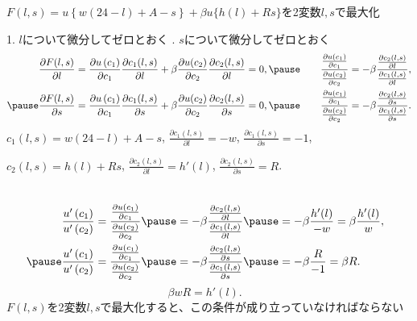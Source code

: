 \begin{frame}[t]{}
$F(l, s)=u\left\{w(24-l)+A-s\right\}+\beta u\{h(l)+Rs\}$を2変数$l, s$で最大化

\pause
{\scriptsize 1. $l$について微分してゼロとおく . $s$について微分してゼロとおく}
\[
\begin{aligned}
\frac{\partial F(l, s)}{\partial l}
&=
\frac{\partial u\left(c_{1}\right)}{\partial c_{1}}\frac{\partial c_{1}(l, s)}{\partial l}
+\beta \frac{\partial u(c_{2})}{\partial c_{2}}\frac{\partial c_{2}(l, s)}{\partial l}=0, 
\pause
\quad 
&\frac{\frac{\partial u\left(c_{1}\right)}{\partial c_{1}}}{\frac{\partial u\left(c_{2}\right)}{\partial c_{2}}}
&=
-\beta \frac{\frac{\partial c_{2}(l, s)}{\partial l}}{\frac{\partial c_{1}(l, s)}{\partial l}},\\
\pause
\frac{\partial F(l, s)}{\partial s}
&=
\frac{\partial u\left(c_{1}\right)}{\partial c_{1}}\frac{\partial c_{1}(l, s)}{\partial s}
+\beta \frac{\partial u(c_{2})}{\partial c_{2}}\frac{\partial c_{2}(l, s)}{\partial s}=0, 
\pause
\quad
&\frac{\frac{\partial u\left(c_{1}\right)}{\partial c_{1}}}{\frac{\partial u\left(c_{2}\right)}{\partial c_{2}}}
&=
-\beta \frac{\frac{\partial c_{2}(l, s)}{\partial s}}{\frac{\partial c_{1}(l, s)}{\partial s}}.
\end{aligned}
\]
\pause
$c_{1}(l, s)=w(24-l)+A-s$\pause, $\frac{\partial c_{1}(l, s)}{\partial l}=-w$, $\frac{\partial c_{1}(l, s)}{\partial s}=-1$, 

\pause
$c_{2}(l, s)=h(l)+Rs$\pause, $\frac{\partial c_{2}(l, s)}{\partial l}=h'(l)$, $\frac{\partial c_{2}(l, s)}{\partial s}=R$.
\begin{columns}[T]
\pause
\[
\begin{aligned}
\frac{u'\left(c_{1}\right)}{u'\left(c_{2}\right)}&=
\frac{\frac{\partial u\left(c_{1}\right)}{\partial c_{1}}}{\frac{\partial u\left(c_{2}\right)}{\partial c_{2}}}
\pause
=
-\beta \frac{\frac{\partial c_{2}(l, s)}{\partial l}}{\frac{\partial c_{1}(l, s)}{\partial l}}
\pause
=-\beta\frac{h'(l)}{-w}=\beta\frac{h'(l)}{w},\\
\pause
\frac{u'\left(c_{1}\right)}{u'\left(c_{2}\right)}&=
\frac{\frac{\partial u\left(c_{1}\right)}{\partial c_{1}}}{\frac{\partial u\left(c_{2}\right)}{\partial c_{2}}}
\pause
=
-\beta \frac{\frac{\partial c_{2}(l, s)}{\partial s}}{\frac{\partial c_{1}(l, s)}{\partial s}}
\pause
=-\beta\frac{R}{-1}=\beta R. 
\end{aligned}
\]
\pause
\[
\beta wR=h'(l).
\]
$F(l, s)$を2変数$l, s$で最大化すると、この条件が成り立っていなければならない
\end{columns}
\end{frame}

